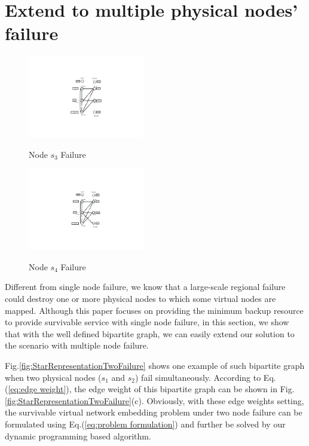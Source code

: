 \section{Extend to multiple physical nodes' failure}
\label{sec:Extend to multiple physical nodes' failure}



\begin{figure}
\centering
\includegraphics[width=2in]{Fig/Node3Failure}\\
  \caption{Node $s_3$ Failure}\label{fig:Node3Failure}
\end{figure}

\begin{figure}
\centering
\includegraphics[width=2in]{Fig/Node4Failure}\\
  \caption{Node $s_4$ Failure}\label{fig:Node4Failure}
\end{figure}

Different from single node failure, we know that a large-scale regional failure could destroy one or more physical nodes to which some virtual nodes are mapped.
Although this paper focuses on providing the minimum  backup resource to provide
survivable service with single node failure, in this section, we show that with the well defined bipartite graph, we can easily  extend our solution to the scenario with multiple node failure.

Fig.\ref{fig:StarRepresentationTwoFailure} shows one example of such  bipartite graph when two physical nodes ($s_1$ and $s_2$) fail simultaneously. According to Eq.(\ref{eq:edge weight}), the edge weight of  this   bipartite graph can be shown in Fig. \ref{fig:StarRepresentationTwoFailure}(c). Obviously, with these edge weights setting, the survivable virtual network embedding problem under two node failure can be formulated using Eq.(\ref{eq:problem formulation}) and further be solved by our dynamic programming based algorithm.


